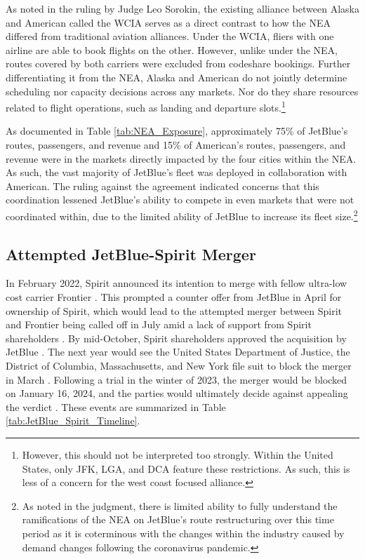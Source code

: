 \documentclass{article}
\begin{document}
	As noted in the ruling by Judge Leo Sorokin, the existing alliance between Alaska and American called the WCIA serves as a direct contrast to how the NEA differed from traditional aviation alliances. Under the WCIA, fliers with one airline are able to book flights on the other. However, unlike under the NEA, routes covered by both carriers were excluded from codeshare bookings. Further differentiating it from the NEA, Alaska and American do not jointly determine scheduling nor capacity decisions across any markets. Nor do they share resources related to flight operations, such as landing and departure slots.\footnote{However, this should not be interpreted too strongly. Within the United States, only JFK, LGA, and DCA feature these restrictions. As such, this is less of a concern for the west coast focused alliance.} 
	
	 As documented in Table \ref{tab:NEA_Exposure}, approximately 75\% of JetBlue's routes, passengers, and revenue and 15\% of American's routes, passengers, and revenue were in the markets directly impacted by the four cities within the NEA. As such, the vast majority of JetBlue's fleet was deployed in collaboration with American. The ruling against the agreement indicated concerns that this coordination lessened JetBlue's ability to compete in even markets that were not coordinated within, due to the limited ability of JetBlue to increase its fleet size.\footnote{As noted in the judgment, there is limited ability to fully understand the ramifications of the NEA on JetBlue's route restructuring over this time period as it is coterminous with the changes within the industry caused by demand changes following the coronavirus pandemic.}
	
	\subsection{Attempted JetBlue-Spirit Merger}
	\label{sec:Setting_Merger}
	In February 2022, Spirit announced its intention to merge with fellow ultra-low cost carrier Frontier \citep{schaper_frontier-spirit_2022}. This prompted a counter offer from JetBlue in April for ownership of Spirit, which would lead to the attempted merger between Spirit and Frontier being called off in July amid a lack of support from Spirit shareholders \citep{josephs_jetblue_2022, josephs_spirit_2022}. By mid-October, Spirit shareholders approved the acquisition by JetBlue \citep{koenig_spirit_2022}. The next year would see the United States Department of Justice, the District of Columbia, Massachusetts, and New York file suit to block the merger in March \citep{chokshi_justice_2023}. Following a trial in the winter of 2023, the merger would be blocked on January 16, 2024, and the parties would ultimately decide against appealing the verdict \citep{chapman_jetblue_2024}.  These events are summarized in Table \ref{tab:JetBlue_Spirit_Timeline}. 
	
\end{document}
